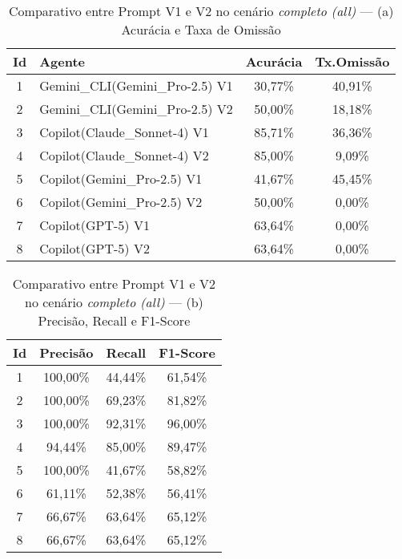 \begin{table}[H]
\centering
\caption{Comparativo entre Prompt V1 e V2 no cenário \textit{completo (all)} — (a) Acurácia e Taxa de Omissão}
\label{tab:all-a}
\begin{tabular}{|c|l|c|c|}
\hline
\textbf{Id} & \textbf{Agente} & \textbf{Acurácia} & \textbf{Tx.Omissão} \\
\hline
1 & Gemini\_CLI(Gemini\_Pro-2{.}5) V1 & 30{,}77\% & 40{,}91\% \\
2 & Gemini\_CLI(Gemini\_Pro-2{.}5) V2 & 50{,}00\% & 18{,}18\% \\
\hline
3 & Copilot(Claude\_Sonnet-4) V1      & 85{,}71\% & 36{,}36\% \\
4 & Copilot(Claude\_Sonnet-4) V2      & 85{,}00\% & 9{,}09\% \\
\hline
5 & Copilot(Gemini\_Pro-2{.}5) V1     & 41{,}67\% & 45{,}45\% \\
6 & Copilot(Gemini\_Pro-2{.}5) V2     & 50{,}00\% & 0{,}00\% \\
\hline
7 & Copilot(GPT-5) V1                 & 63{,}64\% & 0{,}00\% \\
8 & Copilot(GPT-5) V2                 & 63{,}64\% & 0{,}00\% \\
\hline
\end{tabular}
\vspace{0.8em}
\end{table}

\begin{table}[H]
\centering
\caption{Comparativo entre Prompt V1 e V2 no cenário \textit{completo (all)} — (b) Precisão, Recall e F1-Score}
\label{tab:all-b}
\begin{tabular}{|c|c|c|c|}
\hline
\textbf{Id} & \textbf{Precisão} & \textbf{Recall} & \textbf{F1-Score} \\
\hline
1 & 100{,}00\% & 44{,}44\% & 61{,}54\% \\
2 & 100{,}00\% & 69{,}23\% & 81{,}82\% \\
\hline
3 & 100{,}00\% & 92{,}31\% & 96{,}00\% \\
4 & 94{,}44\%  & 85{,}00\% & 89{,}47\% \\
\hline
5 & 100{,}00\% & 41{,}67\% & 58{,}82\% \\
6 & 61{,}11\%  & 52{,}38\% & 56{,}41\% \\
\hline
7 & 66{,}67\%  & 63{,}64\% & 65{,}12\% \\
8 & 66{,}67\%  & 63{,}64\% & 65{,}12\% \\
\hline
\end{tabular}
\vspace{0.8em}
\end{table}

